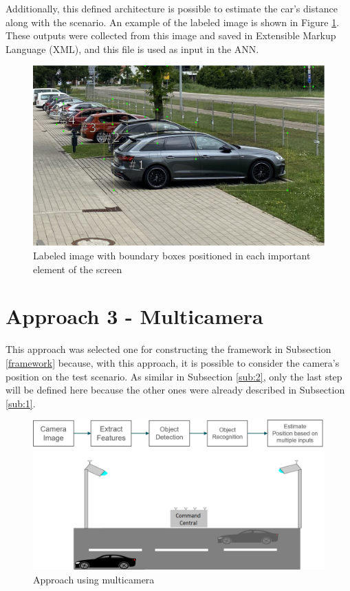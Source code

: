 Additionally, this defined architecture is possible to estimate the car's distance along with the scenario. An example of the labeled image is shown in Figure \ref{fig:boundary_boxes_car}. These outputs were collected from this image and saved in Extensible Markup Language (XML), and this file is used as input in the ANN. 


\begin{figure}[H]
\centering
\includegraphics[scale=0.5]{imagens/boundary_boxes.JPG}
\caption{Labeled image with boundary boxes positioned in each important element of the screen}
\label{fig:boundary_boxes_car}
\end{figure}




\section{Approach 3 - Multicamera}\label{sub:3}

This approach was selected one for constructing the framework in Subsection \ref{framework} because, with this approach, it is possible to consider the camera's position on the test scenario. As similar in Subsection \ref{sub:2}, only the last step will be defined here because the other ones were already described in Subsection \ref{sub:1}. 


\begin{figure}[H]
\centering
\includegraphics[scale=0.6]{imagens/proposal3.png}
\caption{Approach using multicamera}
\label{fig:proposal3}
\end{figure}

